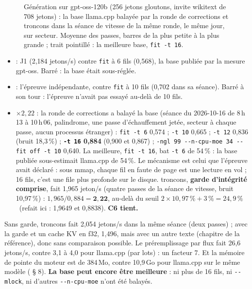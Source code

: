 \begin{figure}[ht]
\centering
\GrapheCchVitesse
\caption[troncons contre llama.cpp balayé]{Génération sur gpt-oss-120b (256 jetons gloutons, invite wikitext de 708 jetons) : la base llama.cpp balayée par la ronde de corrections et troncons dans la séance de vitesse de la même ronde, le même jour, sur secteur. Moyenne des passes, barres de la plus petite à la plus grande ; trait pointillé : la meilleure base, \texttt{fit -t 16}.}
\label{fig:t2o-vitesse}
\end{figure}

\begin{itemize}
\item {} : J1 (2,184 jetons/s) contre \texttt{fit} à 6 fils (0,568), la base publiée par la mesure gpt-oss. Barré : la base était sous-réglée.
\item {} : l'épreuve indépendante, contre \texttt{fit} à 10 fils (0,702 dans sa séance). Barré à son tour : l'épreuve n'avait pas essayé au-delà de 10 fils.
\item \textbf{$\times 2{,}22$} : la ronde de corrections a balayé la base (séance du 2026-10-16 de 8\,h\,13 à 10\,h\,06, palindrome, une passe d'échauffement jetée, secteur à chaque passe, aucun processus étranger) : \texttt{fit -t 6} 0,574 ; \texttt{-t 10} 0,665 ; \texttt{-t 12} 0,836 (bruit 18,3\,\%) ; \textbf{\texttt{-t 16} 0,884} (0,900 et 0,867) ; \texttt{-ngl 99 -{}-n-cpu-moe 34 -{}-fit off -t 10} 0,640. La meilleure, \texttt{fit -t 16}, bat \texttt{-t 6} de 54\,\% : la base publiée sous-estimait llama.cpp de 54\,\%. Le mécanisme est celui que l'épreuve avait déclaré : sous mmap, chaque fil en faute de page est une lecture en vol ; 16 fils, c'est une file plus profonde sur le disque. troncons, \textbf{garde d'intégrité comprise}, fait 1,965 jeton/s (quatre passes de la séance de vitesse, bruit 10,97\,\%) : $1{,}965/0{,}884 = \mathbf{2{,}22}$, au-delà du seuil $2 \times 10{,}97\,\% + 3\,\% = 24{,}9\,\%$ \mes~(refait ici : 1,9649 et 0,8838). \textbf{C6 tient.}
\end{itemize}

Sans garde, troncons fait 2,054 jetons/s dans la même séance (deux passes) ; avec la garde et un cache KV en f32, 1,496, mais avec un autre texte (chapitre de la référence), donc sans comparaison possible. Le préremplissage par flux fait 26,6 jetons/s, contre 3,1 à 4,0 pour llama.cpp (par lots) : un facteur 7. Et la mémoire de pointe du moteur est de 384\,Mo, contre 10,9\,Go pour llama.cpp sur le même modèle ( § 8). \textbf{La base peut encore être meilleure} : ni plus de 16 fils, ni \texttt{-{}-mlock}, ni d'autres \texttt{-{}-n-cpu-moe} n'ont été balayés.

